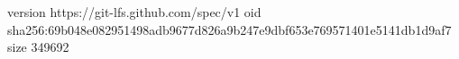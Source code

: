 version https://git-lfs.github.com/spec/v1
oid sha256:69b048e082951498adb9677d826a9b247e9dbf653e769571401e5141db1d9af7
size 349692
